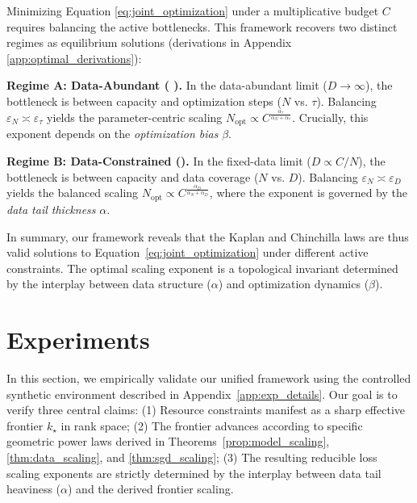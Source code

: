 \documentclass{article}
\theoremstyle{plain}
\theoremstyle{definition}
\theoremstyle{remark}
\begin{document}
Minimizing Equation \eqref{eq:joint_optimization} under a multiplicative budget $C$ requires balancing the active bottlenecks. This framework recovers two distinct regimes as equilibrium solutions (derivations in Appendix \ref{app:optimal_derivations}):

\textbf{Regime A: Data-Abundant (\citet{kaplan2020scalinglawsneurallanguage} ).} In the data-abundant limit ($D \to \infty$), the bottleneck is between capacity and optimization steps ($N$ vs. $\tau$). Balancing $\varepsilon_N \asymp \varepsilon_\tau$ yields the parameter-centric scaling $N_{\text{opt}} \propto C^{\frac{\alpha_\tau}{\alpha_N + \alpha_\tau}}$. Crucially, this exponent depends on the \textit{optimization bias} $\beta$.

\textbf{Regime B: Data-Constrained (\citet{hoffmann2022trainingcomputeoptimallargelanguage}).} In the fixed-data limit ($D \propto C/N$), the bottleneck is between capacity and data coverage ($N$ vs. $D$). Balancing $\varepsilon_N \asymp \varepsilon_D$ yields the balanced scaling $N_{\text{opt}} \propto C^{\frac{\alpha_D}{\alpha_N + \alpha_D}}$, where the exponent is governed by the \textit{data tail thickness} $\alpha$.

In summary, our framework reveals that the Kaplan and Chinchilla laws are thus valid solutions to Equation~\eqref{eq:joint_optimization} under different active constraints. The optimal scaling exponent is a topological invariant determined by the interplay between data structure ($\alpha$) and optimization dynamics ($\beta$).

\section{Experiments}
\label{sec:experiments}

In this section, we empirically validate our unified framework using the controlled synthetic environment described in Appendix~\ref{app:exp_details}. Our goal is to verify three central claims: (1) Resource constraints manifest as a sharp effective frontier $k_\star$ in rank space; (2) The frontier advances according to specific geometric power laws derived in Theorems~\ref{prop:model_scaling}, \ref{thm:data_scaling}, and \ref{thm:sgd_scaling}; (3) The resulting reducible loss scaling exponents are strictly determined by the interplay between data tail heaviness ($\alpha$) and the derived frontier scaling.
\end{document}
